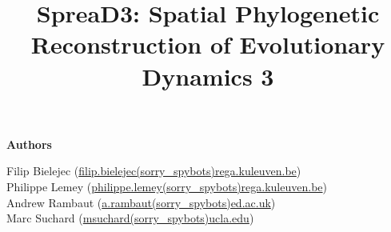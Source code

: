 \documentclass[english]{paper}
\def \spreadname {SpreaD3}
\begin{document}
\title{{\spreadname}: Spatial Phylogenetic Reconstruction of Evolutionary Dynamics 3}
\maketitle

\begin{flushleft}
\textbf{Authors}
\par\end{flushleft}

\noindent
Filip Bielejec (\url{filip.bielejec(sorry_spybots)rega.kuleuven.be}) \\
Philippe Lemey (\url{philippe.lemey(sorry_spybots)rega.kuleuven.be}) \\
Andrew Rambaut (\url{a.rambaut(sorry_spybots)ed.ac.uk}) \\
Marc Suchard (\url{msuchard(sorry_spybots)ucla.edu})\\

\pagebreak{}
\tableofcontents{}
\pagebreak{}




\end{document}
